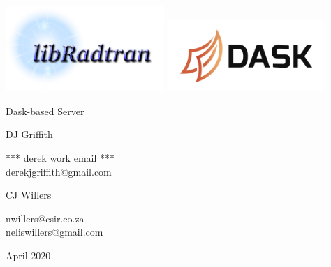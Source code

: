 
\thispagestyle{empty}

{
\sffamily
\centering
\large

~\vspace{\fill}

\vspace{2cm}
\includegraphics[width=0.45\textwidth]{pic/libradtran.png}
\includegraphics[width=0.45\textwidth]{pic/dask.png}

\vspace{3cm}
{\huge Dask-based \libradtran{} Server }

\vspace{1.5cm}
{\Large DJ Griffith }

\vspace{2mm}
*** derek work email ***\\
derekjgriffith@gmail.com

\vspace{1.5cm}
{\Large CJ Willers }

\vspace{2mm}
nwillers@csir.co.za\\
neliswillers@gmail.com


\vspace{\fill}

April 2020

}

\clearpage
\tableofcontents*

\clearpage
\listoffigures*

\clearpage


\clearpage
\listoftodos 